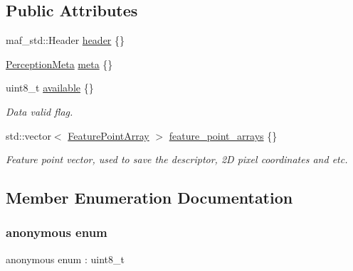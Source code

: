 \subsection*{Public Attributes}
\begin{DoxyCompactItemize}
\item 
maf\+\_\+std\+::\+Header \hyperlink{structmaf__perception__interface_1_1FeaturePointPerception_a31fc7b777f861e523d271f5b32e08886}{header} \{\}
\item 
\hyperlink{structmaf__perception__interface_1_1PerceptionMeta}{Perception\+Meta} \hyperlink{structmaf__perception__interface_1_1FeaturePointPerception_a5ae2f247eb88c16a239c5fcac24f1d3d}{meta} \{\}
\item 
uint8\+\_\+t \hyperlink{structmaf__perception__interface_1_1FeaturePointPerception_a78bb0d5e8cfed091a998781acf60632d}{available} \{\}
\begin{DoxyCompactList}\small\item\em Data valid flag. \end{DoxyCompactList}\item 
std\+::vector$<$ \hyperlink{structmaf__perception__interface_1_1FeaturePointArray}{Feature\+Point\+Array} $>$ \hyperlink{structmaf__perception__interface_1_1FeaturePointPerception_acd8fef28135ebd1ff4784a52b8c1b298}{feature\+\_\+point\+\_\+arrays} \{\}
\begin{DoxyCompactList}\small\item\em Feature point vector, used to save the descriptor, 2D pixel coordinates and etc. \end{DoxyCompactList}\end{DoxyCompactItemize}


\subsection{Member Enumeration Documentation}
\mbox{\label{structmaf__perception__interface_1_1FeaturePointPerception_a66956d7b55299dc298523541b2071d20}} 
\subsubsection{\texorpdfstring{anonymous enum}{anonymous enum}}
{\footnotesize\ttfamily anonymous enum \+: uint8\+\_\+t}

